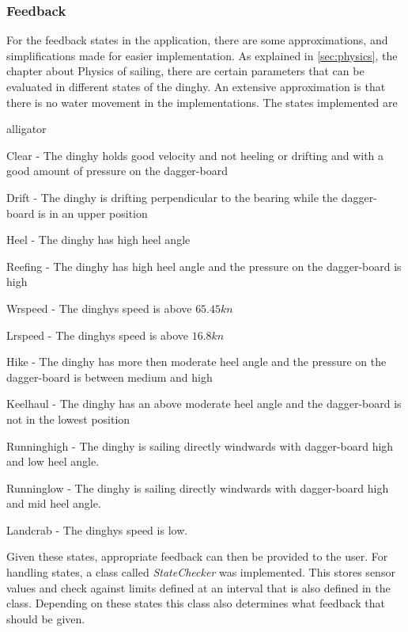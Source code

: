 \subsubsection{Feedback}
For the feedback states in the application, there are some approximations, and simplifications made for easier implementation. As explained in \autoref{sec:physics}, the chapter about Physics of sailing, there are certain parameters that can be evaluated in different states of the dinghy. An extensive approximation is that there is no water movement in the implementations. The states implemented are
\begin{labeling}{alligator}
\item [Clear] - The dinghy holds good velocity and not heeling or drifting and with a good amount of pressure on the dagger-board
\item [Drift] - The dinghy is drifting perpendicular to the bearing while the dagger-board is in an upper position
\item [Heel] - The dinghy has high heel angle
\item [Reefing] - The dinghy has high heel angle and the pressure on the dagger-board is high
\item [Wrspeed] - The dinghys speed is above $65.45kn$
\item [Lrspeed] - The dinghys speed is above $16.8kn$
\item [Hike] - The dinghy has more then moderate heel angle and the pressure on the dagger-board is between medium and high
\item [Keelhaul] - The dinghy has an above moderate heel angle and the dagger-board is not in the lowest position
\item [Runninghigh] - The dinghy is sailing directly windwards with dagger-board high and low heel angle.
\item [Runninglow] - The dinghy is sailing directly windwards with dagger-board high and mid heel angle.
\item [Landcrab] - The dinghys speed is low.
\end{labeling}
Given these states, appropriate feedback can then be provided to the user. For handling states, a class called \emph{StateChecker} was implemented. This stores sensor values and check against limits defined at an interval that is also defined in the class. Depending on these states this class also determines what feedback that should be given.

